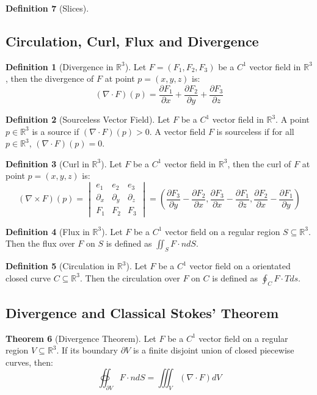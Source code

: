 \documentclass[12pt]{article}
\theoremstyle{definition}
\newtheorem{definition}{Definition}[subsection]
\newtheorem{theorem}[definition]{Theorem}
\theoremstyle{remark}
\begin{document}
\begin{definition}[Slices]
\subsection{Circulation, Curl, Flux and Divergence}
\begin{definition}[Divergence in $\mathbb{R}^3$]
Let $F=(F_1,F_2,F_3)$ be a $C^1$ vector field in $\mathbb{R}^3$, then the divergence of $F$ at point $p=(x,y,z)$ is:
\[
(\nabla\cdot F)(p)=\frac{\partial F_1}{\partial x}+\frac{\partial F_2}{\partial y}+\frac{\partial F_3}{\partial z}
\]
\end{definition}

\begin{definition}[Sourceless Vector Field]
Let $F$ be a $C^1$ vector field in $\mathbb{R}^3$. A point $p\in\mathbb{R}^3$ is a source if $(\nabla\cdot F)(p)>0$. A vector field $F$ is sourceless if for all $p\in \mathbb{R}^3$, $(\nabla \cdot F)(p)=0$.
\end{definition}

\begin{definition}[Curl in $\mathbb{R}^3$]
Let $F$ be a $C^1$ vector field in $\mathbb{R}^3$, then the curl of $F$ at point $p=(x,y,z)$ is:
\[
(\nabla\times F)(p)=\begin{vmatrix}e_1 & e_2 & e_3\\\partial_x & \partial_y & \partial_z\\F_1&F_2&F_3\end{vmatrix}=\left(\frac{\partial F_3}{\partial y}-\frac{\partial F_2}{\partial x},\frac{\partial F_3}{\partial x}-\frac{\partial F_1}{\partial z}, \frac{\partial F_2}{\partial x}-\frac{\partial F_1}{\partial y}\right)
\]
\end{definition}

\begin{definition}[Flux in $\mathbb{R}^3$]
Let $F$ be a $C^1$ vector field on a regular region $S\subseteq\mathbb{R}^3$. Then the flux over $F$ on $S$ is defined as $\displaystyle\iint_S F\cdot ndS$.
\end{definition}

\begin{definition}[Circulation in $\mathbb{R}^3$]
Let $F$ be a $C^1$ vector field on a orientated closed curve $C\subseteq\mathbb{R}^3$. Then the circulation over $F$ on $C$ is defined as $\displaystyle\oint_C F\cdot Tds$.
\end{definition}

\subsection{Divergence and Classical Stokes' Theorem}
\begin{theorem}[Divergence Theorem]
Let $F$ be a $C^1$ vector field on a regular region $V\subseteq\mathbb{R}^3$. If its boundary $\partial V$ is a finite disjoint union of closed piecewise curves, then:
\[
\oiint_{\partial V}F\cdot ndS=\iiint_V(\nabla\cdot F)dV
\]
\end{theorem}


\end{definition}
\end{document}
